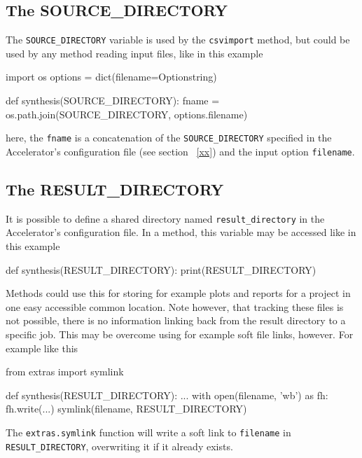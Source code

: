 \subsection{The SOURCE\_DIRECTORY}
The \texttt{SOURCE\_DIRECTORY} variable is used by
the \texttt{csvimport} method, but could be used by any method reading
input files, like in this example
\begin{python}
import os
options = dict(filename=Optionstring)

def synthesis(SOURCE_DIRECTORY):
    fname = os.path.join(SOURCE_DIRECTORY, options.filename)
\end{python}
here, the \texttt{fname} is a concatenation of
the \texttt{SOURCE\_DIRECTORY} specified in the Accelerator's
configuration file (see section ~\ref{xx}) and the input
option \texttt{filename}.


\subsection{The RESULT\_DIRECTORY}
It is possible to define a shared directory
named \texttt{result\_directory} in the Accelerator's configuration
file.  In a method, this variable may be accessed like in this example
\begin{python}
def synthesis(RESULT_DIRECTORY):
    print(RESULT_DIRECTORY)
\end{python}
Methods could use this for storing for example plots and reports for a
project in one easy accessible common location.  Note however, that
tracking these files is not possible, there is no information linking
back from the result directory to a specific job.  This may be
overcome using for example soft file links, however.  For example like
this
\begin{python}
from extras import symlink

def synthesis(RESULT_DIRECTORY):
    ...
    with open(filename, 'wb') as fh:
         fh.write(...)
    symlink(filename, RESULT_DIRECTORY)
\end{python}
The \texttt{extras.symlink} function will write a soft link
to \texttt{filename} in \texttt{RESULT\_DIRECTORY}, overwriting it if
it already exists.
